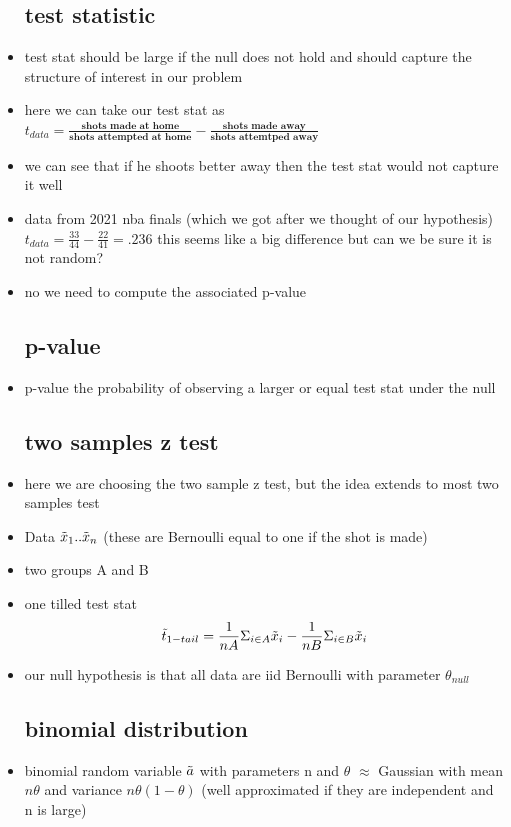 \documentclass{article}
\begin{document}
\begin{itemize}
\subsection{test statistic}
\item test stat should be large if the null does not hold and should capture the structure of interest in our problem 
\item here we can take our test stat as $t_{data}=\frac{\textbf{shots made at home}}{\textbf{shots attempted at home}}- \frac{\textbf{shots made away}}{\textbf{shots attemtped away}}$
\item we can see that if he shoots better away then the test stat would not capture it well
\item data from 2021 nba finals (which we got after we thought of our hypothesis) $t_{data}=\frac{33}{44}-\frac{22}{41}=.236$ this seems like a big difference but can we be sure it is not random? 
\item no we need to compute the associated p-value
\subsection{p-value}
\item  p-value the probability of observing a larger or equal test stat under the null 
\subsection{two samples z test}
\item here we are choosing the two sample z test, but the idea extends to most two samples test
\item Data $\Tilde{x}_1..\Tilde{x}_n$ (these are Bernoulli equal to one if the shot is made) 
\item two groups A and B 
\item one tilled test stat $$\Tilde{t}_{1-tail}=\frac{1}{nA}\Sigma_{i\in A}\Tilde{x}_i-\frac{1}{nB}\Sigma_{i\in B}\Tilde{x}_i$$
\item our null hypothesis is that all data are iid Bernoulli with parameter $\theta_{null}$
\subsection{binomial distribution}
\item binomial random variable $\Tilde{a}$ with parameters n and $\theta$ $\approx$ Gaussian with mean $n\theta$ and variance $n\theta(1-\theta)$  (well approximated if they are independent and n is large)

\end{itemize}
\end{document}
